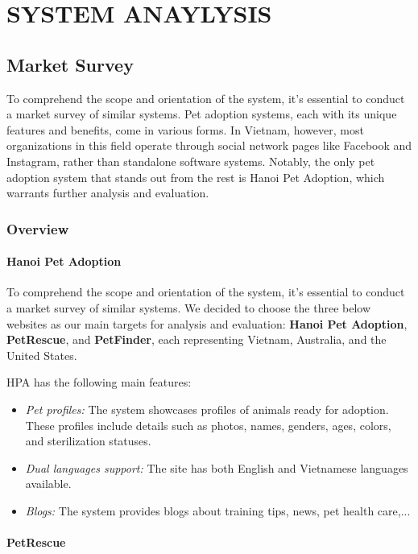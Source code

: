 
\chapter{SYSTEM ANAYLYSIS}
\section{Market Survey}
To comprehend the scope and orientation of the system, it’s essential to conduct a market survey of similar systems. Pet adoption systems, each with its unique features and benefits, come in various forms. In Vietnam, however, most organizations in this field operate through social network pages like Facebook and Instagram, rather than standalone software systems. Notably, the only pet adoption system that stands out from the rest is Hanoi Pet Adoption, which warrants further analysis and evaluation.

\subsection{Overview}
\subsubsection*{Hanoi Pet Adoption}
To comprehend the scope and orientation of the system, it’s essential to conduct a market survey of similar systems. We decided to choose the three below websites as our main targets for analysis and evaluation:
\textbf{Hanoi Pet Adoption}, \textbf{PetRescue}, and \textbf{PetFinder}, each representing Vietnam, Australia, and the United States.

HPA has the following main features:
\begin{itemize}
  \item \textit{Pet profiles:} The system showcases profiles of animals ready for adoption. These profiles include details such as photos, names, genders, ages, colors, and sterilization statuses.
  \item \textit{Dual languages support:} The site has both English and Vietnamese languages available.
  \item \textit{Blogs:}  The system provides blogs about training tips, news, pet health care,...
\end{itemize}

\subsubsection*{PetRescue}

